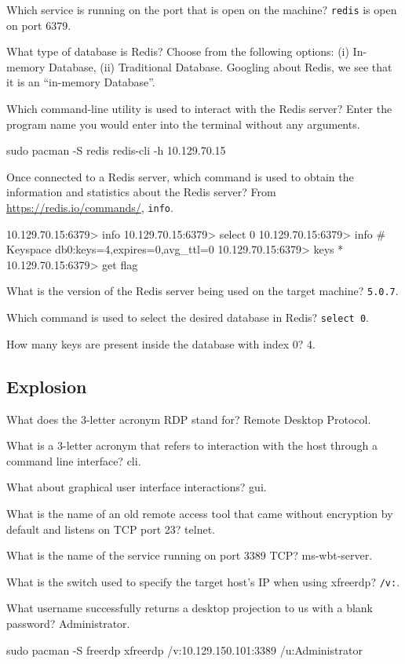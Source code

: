 \documentclass[a4paper,10pt]{article}
\begin{document}
Which service is running on the port that is open on the machine? \texttt{redis} is open on port 6379.

What type of database is Redis? Choose from the following options: (i) In-memory Database, (ii) Traditional Database.
Googling about Redis, we see that it is an ``in-memory Database''.

Which command-line utility is used to interact with the Redis server? Enter the program name you would enter into the terminal without any arguments.
\begin{bash}
sudo pacman -S redis
redis-cli -h 10.129.70.15
\end{bash}

Once connected to a Redis server, which command is used to obtain the information and statistics about the Redis server? From \url{https://redis.io/commands/}, \texttt{info}.
\begin{bash}
10.129.70.15:6379> info
10.129.70.15:6379> select 0
10.129.70.15:6379> info
# Keyspace
db0:keys=4,expires=0,avg_ttl=0
10.129.70.15:6379> keys *
10.129.70.15:6379> get flag
\end{bash}


What is the version of the Redis server being used on the target machine? \texttt{5.0.7}.

Which command is used to select the desired database in Redis? \texttt{select 0}.

How many keys are present inside the database with index 0? 4.

\subsection{Explosion \faWindows}
What does the 3-letter acronym RDP stand for? Remote Desktop Protocol.

What is a 3-letter acronym that refers to interaction with the host through a command line interface? cli.

What about graphical user interface interactions? gui.

What is the name of an old remote access tool that came without encryption by default and listens on TCP port 23? telnet.

What is the name of the service running on port 3389 TCP? ms-wbt-server.

What is the switch used to specify the target host's IP when using xfreerdp? \texttt{/v:}.

What username successfully returns a desktop projection to us with a blank password? Administrator.
\begin{bash}
sudo pacman -S freerdp
xfreerdp /v:10.129.150.101:3389 /u:Administrator
\end{bash}
\end{document}
